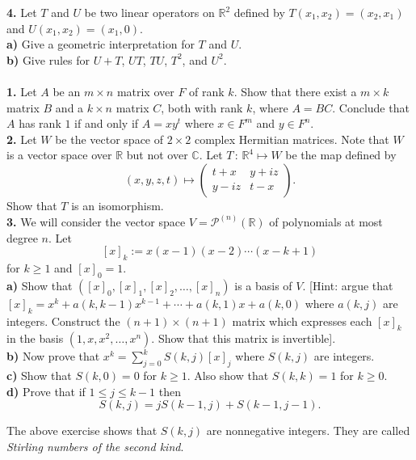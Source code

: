 \documentclass[11pt]{amsart}
\theoremstyle{definition}  %
\newcommand{\R}{\mathbb{R}}
\newcommand{\C}{\mathbb{C}}
\begin{document}
\vskip 0.1cm
\noindent
{\bf 4.} Let $T$ and $U$ be two linear operators on $\R^2$ defined by $T(x_1, x_2) = (x_2,x_1)$ and $U(x_1,x_2) = (x_1,0)$. \\
{\bf a)} Give a geometric interpretation for $T$ and $U$. \\
{\bf b)} Give rules for $U+T$, $UT$, $TU$, $T^2$, and $U^2$. \\





\vfill
\eject
{}\\
{\bf 1.} Let $A$ be an $m \times n$ matrix over $F$ of rank $k$. Show that there exist a $m \times k$ matrix $B$ and a
$k \times n$ matrix $C$, both with rank $k$, where $A = BC$. Conclude that $A$ has rank $1$ if and only if $A = xy^t$ where
$x \in F^m$ and $y \in F^n$. \\


\vskip 0.1cm
\noindent 
{\bf 2.} Let $W$ be the vector space of $2 \times 2$ complex Hermitian matrices. Note that $W$ is a vector space over $\R$ but not
over $\C$. Let $T \, : \, \R^4 \mapsto W$ be the map defined by 
$$ (x,y,z,t) \mapsto \left( \begin{array}{cc} t +x & y + iz \\ y - iz & t -x \end{array} \right).$$
Show that $T$ is an isomorphism. \\



\vskip 0.1cm
\noindent
{\bf 3.} We will consider the vector space $ V = \mathcal{P}^{(n)}(\R)$ of polynomials at most degree $n$. Let 
$$[x]_k := x(x-1)(x-2) \cdots (x-k+1)$$
for $k \geq 1$ and $[x]_0 = 1$. \\
{\bf a)} Show that $([x]_0, [x]_1, [x]_2, \ldots, [x]_n)$ is a basis of $V$. [Hint: argue that   
$[x]_k = x^k + a(k,k-1) x^{k-1} + \cdots + a(k,1) x + a(k,0)$ where $a(k,j)$ are integers. Construct the $(n+1) \times (n+1)$ matrix
which expresses each $[x]_k$ in the basis $(1,x,x^2, \ldots, x^n)$. Show that this matrix is invertible].\\
{\bf b)} Now prove that $x^k = \sum_{j=0}^k S(k,j) [x]_j$ where $S(k,j)$ are integers. \\
{\bf c)} Show that $S(k,0) = 0 $ for $k \geq 1$. Also show that $S(k,k) = 1$ for $k\geq 0 $. \\
{\bf d)} Prove that if $ 1 \leq j \leq k-1$ then
$$ S(k,j) = j S(k-1, j) + S(k-1, j-1).$$ 

\vskip 0.1cm
\noindent
The above exercise shows that $S(k,j)$ are nonnegative integers. They are called {\it Stirling numbers of the second kind}. 
\end{document}
